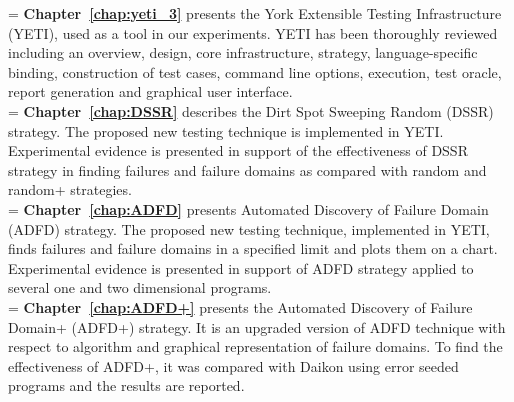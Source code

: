 \hangindent=\parindent
{}
\noindent
\textbf{Chapter~\ref{chap:yeti_3}} presents the York Extensible Testing Infrastructure (YETI), used as a tool in our experiments. YETI has been thoroughly reviewed including an overview, design, core infrastructure, strategy, language-specific binding, construction of test cases, command line options, execution, test oracle, report generation and graphical user interface.\\

\hangindent=\parindent
{}
\noindent
\textbf{Chapter~\ref{chap:DSSR}} describes the Dirt Spot Sweeping Random (DSSR) strategy. The proposed new testing technique is implemented in YETI. Experimental evidence is presented in support of the effectiveness of DSSR strategy in finding failures and failure domains as compared with random and random+ strategies. \\

\hangindent=\parindent
{}
\noindent
\textbf{Chapter~\ref{chap:ADFD}} presents Automated Discovery of Failure Domain (ADFD) strategy. The proposed new testing technique, implemented in YETI, finds failures and failure domains in a specified limit and plots them on a chart. Experimental evidence is presented in support of ADFD strategy applied to several one and two dimensional programs. \\

 
\hangindent=\parindent
{}
\noindent
\textbf{Chapter~\ref{chap:ADFD+}} presents the Automated Discovery of Failure Domain+ (ADFD+) strategy. It is an upgraded version of ADFD technique with respect to algorithm and graphical representation of failure domains. To find the effectiveness of ADFD+, it was compared with Daikon using error seeded programs and the results are reported.\\ 



